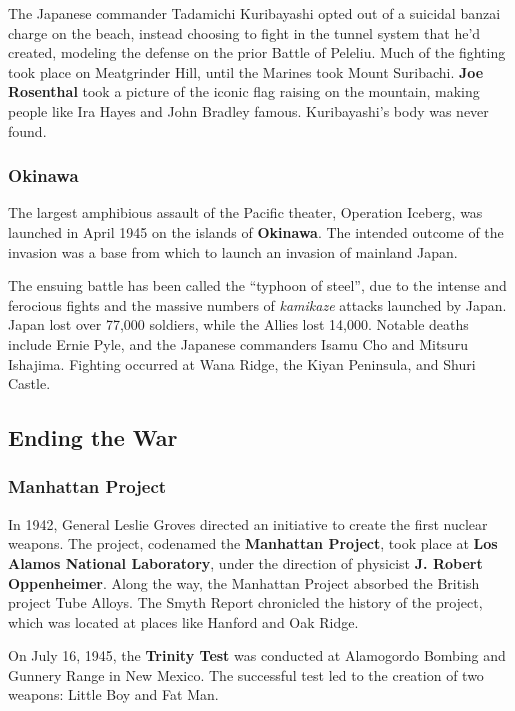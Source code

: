 The Japanese commander Tadamichi Kuribayashi opted out of a suicidal banzai charge on the beach,
instead choosing to fight in the tunnel system that he'd created,
modeling the defense on the prior Battle of Peleliu.
Much of the fighting took place on Meatgrinder Hill,
until the Marines took Mount Suribachi.
\textbf{Joe Rosenthal} took a picture of the iconic flag raising on the mountain,
making people like Ira Hayes and John Bradley famous.
Kuribayashi's body was never found.

\subsubsection*{Okinawa}

The largest amphibious assault of the Pacific theater, Operation Iceberg,
was launched in April 1945 on the islands of \textbf{Okinawa}.
The intended outcome of the invasion was a base from which to launch an invasion of mainland Japan.

The ensuing battle has been called the ``typhoon of steel'',
due to the intense and ferocious fights
and the massive numbers of \textit{kamikaze} attacks launched by Japan.
Japan lost over 77,000 soldiers, while the Allies lost 14,000.
Notable deaths include Ernie Pyle, and the Japanese commanders Isamu Cho and Mitsuru Ishajima.
Fighting occurred at Wana Ridge, the Kiyan Peninsula, and Shuri Castle.

\subsection*{Ending the War}

\subsubsection*{Manhattan Project}

In 1942, General Leslie Groves directed an initiative to create the first nuclear weapons.
The project, codenamed the \textbf{Manhattan Project},
took place at \textbf{Los Alamos National Laboratory},
under the direction of physicist \textbf{J. Robert Oppenheimer}.
Along the way, the Manhattan Project absorbed the British project Tube Alloys.
The Smyth Report chronicled the history of the project,
which was located at places like Hanford and Oak Ridge.

On July 16, 1945,
the \textbf{Trinity Test} was conducted at Alamogordo Bombing and Gunnery Range in New Mexico.
The successful test led to the creation of two weapons: Little Boy and Fat Man.

